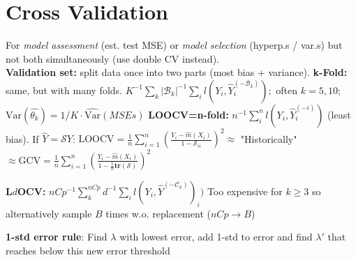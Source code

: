 \section*{Cross Validation}
For \textit{model assessment} (est. test MSE) or \textit{model selection} (hyperp.s / var.s) but not both simultaneously (use double CV instead). \\
\textbf{Validation set:} split data once into two parts (most bias + variance).
\textbf{k-Fold:} same, but with many folds. $K^{-1}\sum_k |\mathcal{B}_k|^{-1}\sum_i l(Y_i,\hat{Y}^{(-\mathcal{B}_k)}_i);$ often $k=5,10$; $\text{Var}(\hat {\theta_k}) = 1/K \cdot \hat {\text{Var}}(MSEs)$ \textbf{LOOCV=n-fold:} $ n^{-1}\sum_i^n l(Y_i,\hat{Y}_i^{(-i)})$ (least bias). If $\hat Y = \mathcal{S}Y$: $\text{LOOCV} = \frac{1}{n}\sum_{i=1}^n\left(\frac{Y_i-\hat m(X_i)}{1-\mathcal{S}_{ii}}\right)^2\approx$
"Historically" $\approx\text{GCV} = \frac{1}{n}\sum_{i=1}^n\left(\frac{Y_i-\hat m(X_i)}{1-\frac{1}{n}\mathbf{tr}(\mathcal{S})}\right)^2$

\textbf{L$d$OCV:} $nCp^{-1}\sum^{nCp}_k d^{-1}\sum_i l(Y_i,\hat{Y}^{(-\mathcal{C}_k)})_i)$ Too expensive for $k\geq 3$ so alternatively sample $B$ times w.o. replacement ($nCp\rightarrow B$)

\textbf{1-std error rule}: Find $\lambda$ with lowest error, add 1-std to error and find $\lambda'$ that reaches below this new error threshold

